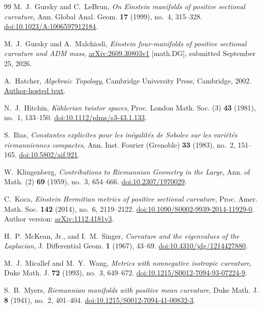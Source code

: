 \begin{thebibliography}{99}
M.~J.~Gursky and C.~LeBrun, \emph{On Einstein manifolds of positive sectional curvature}, Ann. Global Anal. Geom. \textbf{17} (1999), no.~4, 315--328.
\href{https://doi.org/10.1023/A:1006597912184}{doi:10.1023/A:1006597912184}.

M.~J.~Gursky and A.~Malchiodi,
\emph{Einstein four-manifolds of positive sectional curvature and ADM mass},
\href{https://arxiv.org/abs/2609.30803v1}{arXiv:2609.30803v1} [math.DG], submitted September 25, 2026.

A.~Hatcher, \emph{Algebraic Topology}, Cambridge University Press, Cambridge, 2002.
\href{https://pi.math.cornell.edu/~hatcher/AT/AT.pdf}{Author-hosted text}.

N.~J.~Hitchin, \emph{K\"ahlerian twistor spaces},
Proc. London Math. Soc. (3) \textbf{43} (1981), no.~1, 133--150.
\href{https://doi.org/10.1112/plms/s3-43.1.133}{doi:10.1112/plms/s3-43.1.133}.

S.~Ilias, \emph{Constantes explicites pour les in\'egalit\'es de Sobolev sur les vari\'et\'es riemanniennes compactes}, Ann. Inst. Fourier (Grenoble) \textbf{33} (1983), no.~2, 151--165.
\href{https://doi.org/10.5802/aif.921}{doi:10.5802/aif.921}.

W.~Klingenberg, \emph{Contributions to Riemannian Geometry in the Large}, Ann. of Math. (2) \textbf{69} (1959), no.~3, 654--666.
\href{https://doi.org/10.2307/1970029}{doi:10.2307/1970029}.

C.~Koca, \emph{Einstein Hermitian metrics of positive sectional curvature}, Proc. Amer. Math. Soc. \textbf{142} (2014), no.~6, 2119--2122.
\href{https://doi.org/10.1090/S0002-9939-2014-11929-0}{doi:10.1090/S0002-9939-2014-11929-0}.
Author version: \href{https://arxiv.org/abs/1112.4181v3}{arXiv:1112.4181v3}.

H.~P.~McKean, Jr., and I.~M.~Singer, \emph{Curvature and the eigenvalues of the Laplacian}, J. Differential Geom. \textbf{1} (1967), 43--69.
\href{https://doi.org/10.4310/jdg/1214427880}{doi:10.4310/jdg/1214427880}.

M.~J.~Micallef and M.~Y.~Wang,
\emph{Metrics with nonnegative isotropic curvature},
Duke Math. J. \textbf{72} (1993), no.~3, 649--672.
\href{https://doi.org/10.1215/S0012-7094-93-07224-9}{doi:10.1215/S0012-7094-93-07224-9}.

S.~B.~Myers, \emph{Riemannian manifolds with positive mean curvature}, Duke Math. J. \textbf{8} (1941), no.~2, 401--404.
\href{https://doi.org/10.1215/S0012-7094-41-00832-3}{doi:10.1215/S0012-7094-41-00832-3}.


\end{thebibliography}
